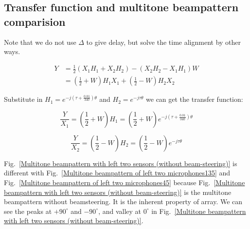 \documentclass[onecolumn, conference]{IEEEtran}
\begin{document}
\subsection{Transfer function and multitone	beampattern comparision}
Note that we do not use $\Delta$ to give delay, but solve the time alignment by other ways.

\begin{equation}
\begin{aligned}
Y&= \frac{1}{2}(X_1H_1+X_2H_2)-(X_2H_2-X_1H_1)W \\
&=(\frac{1}{2}+W)H_1X_1+(\frac{1}{2}-W)H_2X_2
\end{aligned}
\label{eq}
\end{equation}

Substitute in \(H_1=e^{-j(\tau+\frac{0.01}{340})\theta} \) and \(H_2=e^{-j\tau\theta}\) we can get the transfer function:

\begin{equation}
\frac{Y}{X_1}=(\frac{1}{2}+W)H_1 = (\frac{1}{2}+W)e^{-j(\tau+\frac{0.01}{340})\theta}
\label{eq}
\end{equation}

\begin{equation}
\frac{Y}{X_2}=(\frac{1}{2}-W)H_2 = (\frac{1}{2}-W)e^{-j\tau\theta}
\label{eq}
\end{equation}

Fig.~\ref{Multitone beampattern with left two sensors (without beam-steering)} is different with Fig.~\ref{Multitone beampattern of left two microphones135} and Fig.~\ref{Multitone beampattern of left two microphones45} because Fig.~\ref{Multitone beampattern with left two sensors (without beam-steering)} is the multitone beampattern without beamsteering. It is the inherent property of array. We can see the peaks at $+90^{\circ}$ and $-90^{\circ}$, and valley at $0^{\circ}$ in Fig.~\ref{Multitone beampattern with left two sensors (without beam-steering)}.
\end{document}
